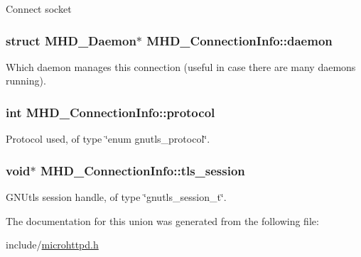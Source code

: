 \-Connect socket \hypertarget{unionMHD__ConnectionInfo_a4f4bebd55f1052ec78275c5bfec06e98}{
\subsubsection[{daemon}]{\setlength{\rightskip}{0pt plus 5cm}struct \-M\-H\-D\-\_\-\-Daemon$\ast$ {\bf \-M\-H\-D\-\_\-\-Connection\-Info\-::daemon}}}\label{unionMHD__ConnectionInfo_a4f4bebd55f1052ec78275c5bfec06e98}
\-Which daemon manages this connection (useful in case there are many daemons running). \hypertarget{unionMHD__ConnectionInfo_a493d7db4e3d5a8a9f3f89b8269d5b6ed}{
\subsubsection[{protocol}]{\setlength{\rightskip}{0pt plus 5cm}int {\bf \-M\-H\-D\-\_\-\-Connection\-Info\-::protocol}}}\label{unionMHD__ConnectionInfo_a493d7db4e3d5a8a9f3f89b8269d5b6ed}
\-Protocol used, of type \char`\"{}enum gnutls\-\_\-protocol\char`\"{}. \hypertarget{unionMHD__ConnectionInfo_ab89cf1c30cc2dec2e43d081e7e40811d}{
\subsubsection[{tls\-\_\-session}]{\setlength{\rightskip}{0pt plus 5cm}void$\ast$ {\bf \-M\-H\-D\-\_\-\-Connection\-Info\-::tls\-\_\-session}}}\label{unionMHD__ConnectionInfo_ab89cf1c30cc2dec2e43d081e7e40811d}
\-G\-N\-Utls session handle, of type \char`\"{}gnutls\-\_\-session\-\_\-t\char`\"{}. 

\-The documentation for this union was generated from the following file\-:\begin{DoxyCompactItemize}
\item 
include/\hyperlink{microhttpd_8h}{microhttpd.\-h}\end{DoxyCompactItemize}
